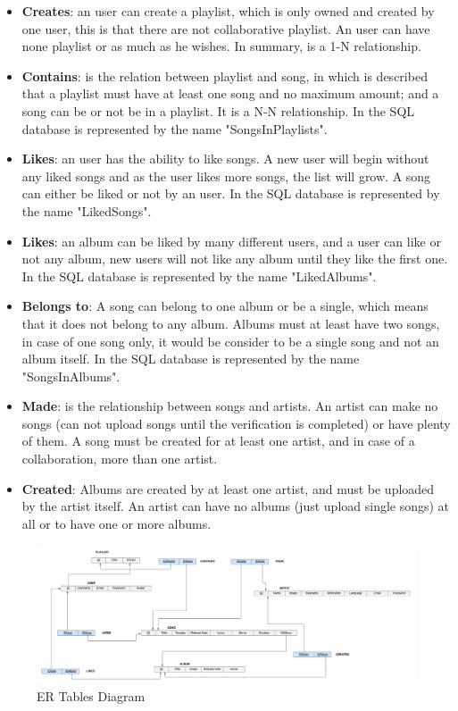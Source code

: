 \begin{itemize}
    \item \textbf{Creates}: an user can create a playlist, which is only owned and created by one user, this is that there are not collaborative playlist. An user can have none playlist or as much as he wishes. In summary, is a 1-N relationship.
    \item \textbf{Contains}: is the relation between playlist and song, in which is described that a playlist must have at least one song and no maximum amount; and a song can be or not be in a playlist. It is a N-N relationship. In the SQL database is represented by the name "SongsInPlaylists".
    \item \textbf{Likes}: an user has the ability to like songs. A new user will begin without any liked songs and as the user likes more songs, the list will grow. A song can either be liked or not by an user. In the SQL database is represented by the name "LikedSongs".
    \item \textbf{Likes}: an album can be liked by many different users, and a user can like or not any album, new users will not like any album until they like the first one. In the SQL database is represented by the name "LikedAlbums".
    \item \textbf{Belongs to}: A song can belong to one album or be a single, which means that it does not belong to any album. Albums must at least have two songs, in case of one song only, it would be consider to be a single song and not an album itself. In the SQL database is represented by the name "SongsInAlbums".
    \item \textbf{Made}: is the relationship between songs and artists. An artist can make no songs (can not upload songs until the verification is completed) or have plenty of them. A song must be created for at least one artist, and in case of a collaboration, more than one artist.
    \item \textbf{Created}: Albums are created by at least one artist, and must be uploaded by the artist itself. An artist can have no albums (just upload single songs) at all or to have one or more albums.
\end{itemize}




\begin{figure}[h]
\centering
\includegraphics[width=1.1\textwidth]{sections/DLL/BD_ER_TABLE.png}
\caption{ER Tables Diagram}
\end{figure}




